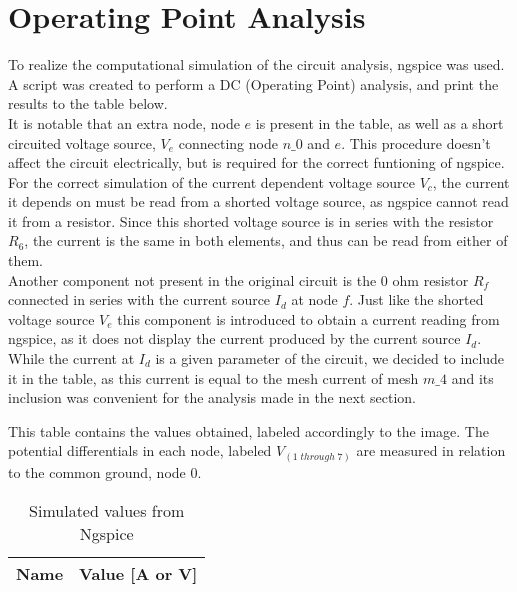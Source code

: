 \section{Operating Point Analysis}
\label{sec:simulation}

To realize the computational simulation of the circuit analysis, ngspice was used. A script was created to perform a DC (Operating Point) analysis, and print the results to the table below.\\
It is notable that an extra node, node $e$ is present in the table, as well as a short circuited voltage source, $V_{e}$ connecting node $n\_0$ and $e$. This procedure doesn't affect the circuit electrically, but is required for the correct funtioning of ngspice. For the correct simulation of the current dependent voltage source $V_{c}$, the current it depends on must be read from a shorted voltage source, as ngspice cannot read it from a resistor. Since this shorted voltage source is in series with the resistor $R_{6}$, the current is the same in both elements, and thus can be read from either of them.\\
Another component not present in the original circuit is the 0 ohm resistor $R_{f}$ connected in series with the current source $I_{d}$ at node $f$. Just like the shorted voltage source $V_{e}$ this component is introduced to obtain a current reading from ngspice, as it does not display the current produced by the current source $I_{d}$. While the current at $I_{d}$ is a given parameter of the circuit, we decided to include it in the table, as this current is equal to the mesh current of mesh $m\_4$ and its inclusion was convenient for the analysis made in the next section.

This table contains the values obtained, labeled accordingly to the image. The potential differentials in each node, labeled $V_{(1 \; through \; 7)}$ are measured in relation to the common ground, node 0. 


\FloatBarrier
\begin{table}[h]
  \centering
  \begin{tabular}{|l|r|}
    \hline    
    {\bf Name} & {\bf Value [A or V]} \\ \hline
    
  \end{tabular}
  \caption{Simulated values from Ngspice}
  \label{tab:op}
\end{table}
\FloatBarrier


